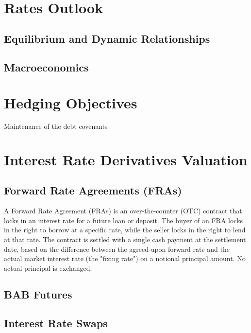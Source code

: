 \documentclass[11pt, a4paper, british]{article}
\begin{document}
\newpage
\section{Rates Outlook}

\subsection{Equilibrium and Dynamic Relationships}

\subsection{Macroeconomics}

\newpage

\section{Hedging Objectives}

Maintenance of the debt covenants 

\newpage

\section{Interest Rate Derivatives Valuation}

\newpage

\subsection{Forward Rate Agreements (FRAs)}

A Forward Rate Agreement (FRAs) is an over-the-counter (OTC) contract that locks in an interest rate for a future loan or deposit. The buyer of an FRA locks in the right to borrow at a specific rate, while the seller locks in the right to lend at that rate. The contract is settled with a single cash payment at the settlement date, based on the difference between the agreed-upon forward rate and the actual market interest rate (the "fixing rate") on a notional principal amount. No actual principal is exchanged.

\newpage

\subsection{BAB Futures}

\newpage

\subsection{Interest Rate Swaps}
\end{document}
